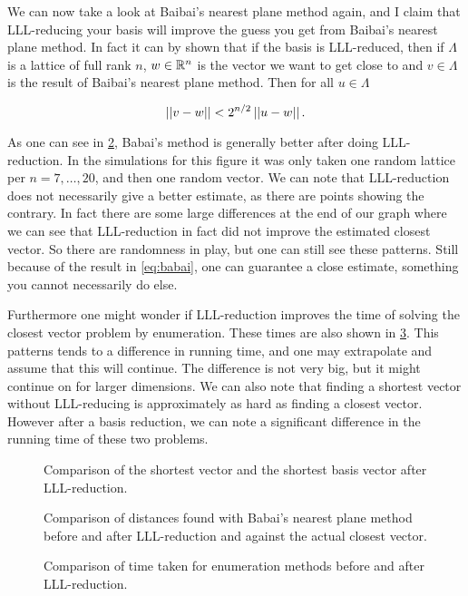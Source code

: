   We can now take a look at Baibai's nearest plane method again, and I claim that LLL-reducing your basis will improve the guess you get from Baibai's nearest plane method.
  In fact it can by shown that if the basis is LLL-reduced, then if $\Lambda$ is a lattice of full rank $n$, $w\in \mathbb{R}^n$ is the vector we want to get close to and $v\in \Lambda$ is the result of Baibai's nearest plane method.
  Then for all $u \in \Lambda$

  \begin{equation}
    \left|\left|  v - w  \right|\right| < 2^{n/2} \left|\left|  u - w  \right|\right|.
    \label{eq:babai}
  \end{equation}

  As one can see in \cref{fig:distances}, Babai's method is generally better after doing LLL-reduction.
  In the simulations for this figure it was only taken one random lattice per $n = 7, \dots, 20$, and then one random vector.
  We can note that LLL-reduction does not necessarily give a better estimate, as there are points showing the contrary.
  In fact there are some large differences at the end of our graph where we can see that LLL-reduction in fact did not improve the estimated closest vector.
  So there are randomness in play, but one can still see these patterns.
  Still because of the result in \eqref{eq:babai}, one can guarantee a close estimate, something you cannot necessarily do else.

  Furthermore one might wonder if LLL-reduction improves the time of solving the closest vector problem by enumeration.
  These times are also shown in \cref{fig:enum-lll}.
  This patterns tends to a difference in running time, and one may extrapolate and assume that this will continue.
  The difference is not very big, but it might continue on for larger dimensions.
  We can also note that finding a shortest vector without LLL-reducing is approximately as hard as finding a closest vector.
  However after a basis reduction, we can note a significant difference in the running time of these two problems.
  

  \begin{figure}
    \begin{center}
      
    \end{center}
    \caption{Comparison of the shortest vector and the shortest basis vector after LLL-reduction.}\label{fig:svp-length}
  \end{figure}

  \begin{figure}
    \begin{center}
      
    \end{center}
    \caption{Comparison of distances found with Babai's nearest plane method before and after LLL-reduction and against the actual closest vector.}\label{fig:distances}
  \end{figure}

  \begin{figure}
    \begin{center}
      
    \end{center}
    \caption{Comparison of time taken for enumeration methods before and after LLL-reduction.}\label{fig:enum-lll}
  \end{figure}
